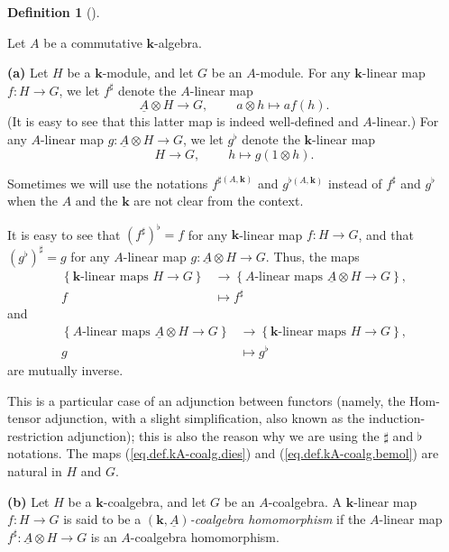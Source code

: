 \documentclass
[numbers=enddot,12pt,final,onecolumn,notitlepage,abstracton]{scrartcl}%
\theoremstyle{definition}
\newtheorem{defi}[theo]{Definition}
\newenvironment{definition}[1][]
{\begin{defi}[#1]\begin{leftbar}}
{\end{leftbar}\end{defi}}
\begin{document}
\begin{definition}
\label{def.kA-coalg}Let $A$ be a commutative $\mathbf{k}$-algebra.

\textbf{(a)} Let $H$ be a $\mathbf{k}$-module, and let $G$ be an $A$-module.
For any $\mathbf{k}$-linear map $f:H\rightarrow G$, we let $f^{\sharp}$ denote
the $A$-linear map%
\[
\underline{A}\otimes H\rightarrow G,\ \ \ \ \ \ \ \ \ \ a\otimes h\mapsto
af\left(  h\right)  .
\]
(It is easy to see that this latter map is indeed well-defined and
$A$-linear.) For any $A$-linear map $g:\underline{A}\otimes H\rightarrow G$,
we let $g^{\flat}$ denote the $\mathbf{k}$-linear map%
\[
H\rightarrow G,\ \ \ \ \ \ \ \ \ \ h\mapsto g\left(  1\otimes h\right)  .
\]


Sometimes we will use the notations $f^{\sharp\left(  A,\mathbf{k}\right)  }$
and $g^{\flat\left(  A,\mathbf{k}\right)  }$ instead of $f^{\sharp}$ and
$g^{\flat}$ when the $A$ and the $\mathbf{k}$ are not clear from the context.

It is easy to see that $\left(  f^{\sharp}\right)  ^{\flat}=f$ for any
$\mathbf{k}$-linear map $f:H\rightarrow G$, and that $\left(  g^{\flat
}\right)  ^{\sharp}=g$ for any $A$-linear map $g:\underline{A}\otimes
H\rightarrow G$. Thus, the maps%
\begin{align}
\left\{  \mathbf{k}\text{-linear maps }H\rightarrow G\right\}   &
\rightarrow\left\{  A\text{-linear maps }\underline{A}\otimes H\rightarrow
G\right\}  ,\nonumber\\
f  &  \mapsto f^{\sharp} \label{eq.def.kA-coalg.dies}%
\end{align}
and%
\begin{align}
\left\{  A\text{-linear maps }\underline{A}\otimes H\rightarrow G\right\}   &
\rightarrow\left\{  \mathbf{k}\text{-linear maps }H\rightarrow G\right\}
,\nonumber\\
g  &  \mapsto g^{\flat} \label{eq.def.kA-coalg.bemol}%
\end{align}
are mutually inverse.

This is a particular case of an adjunction between functors (namely, the
Hom-tensor adjunction, with a slight simplification, also known as the
induction-restriction adjunction); this is also the reason why we are using
the $\sharp$ and $\flat$ notations. The maps (\ref{eq.def.kA-coalg.dies}) and
(\ref{eq.def.kA-coalg.bemol}) are natural in $H$ and $G$.

\textbf{(b)} Let $H$ be a $\mathbf{k}$-coalgebra, and let $G$ be an
$A$-coalgebra. A $\mathbf{k}$-linear map $f:H\rightarrow G$ is said to be a
$\left(  \mathbf{k},\underline{A}\right)  $\textit{-coalgebra homomorphism} if
the $A$-linear map $f^{\sharp}:\underline{A}\otimes H\rightarrow G$ is an
$A$-coalgebra homomorphism.
\end{definition}
\end{document}
